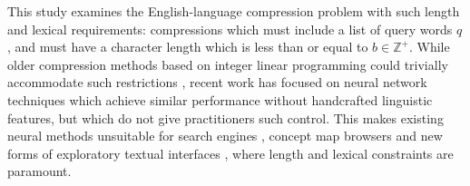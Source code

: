 \documentclass[11pt,a4paper]{article}
\begin{document}
This study examines the English-language compression problem with such length and lexical requirements: compressions which must include a list of query words $q$, and must have a character length which is less than or equal to $b \in \mathbb{Z}^{+}$. While older compression methods based on integer linear programming could trivially accommodate such restrictions \cite{clarke2008global,filippova2013overcoming}, recent work has focused on neural network techniques \cite{filippova2015sentence} which achieve similar performance without handcrafted linguistic features, but which do not give practitioners such control. This makes existing neural methods unsuitable for search engines \cite{hearst2009search}, concept map browsers \cite{falke2017graphdocexplore} and new forms of exploratory textual interfaces \cite{marchionini2006exploratory}, where length and lexical constraints are paramount. 

\begin{figure}[htb!]
\end{figure}
\end{document}
